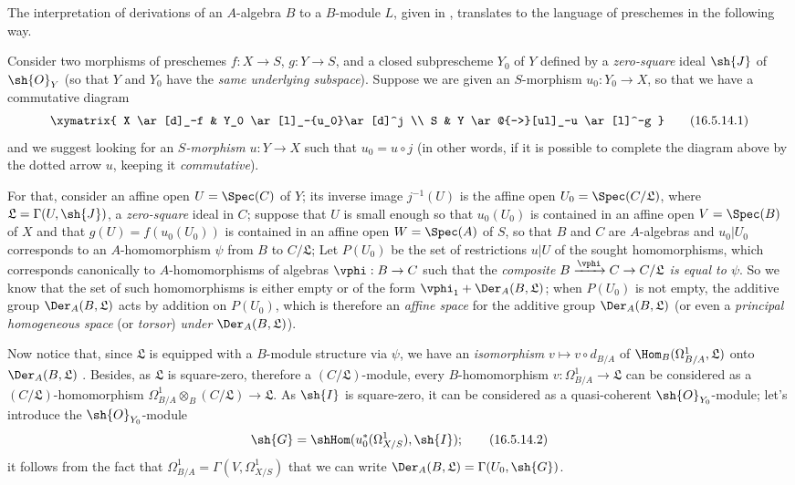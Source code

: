 \begin{env}[16.5.14]
\label{IV.16.5.14}
The interpretation of derivations of an $A$-algebra $B$ to a $B$-module $L$, given in , translates to the language of preschemes in the following way.

Consider two morphisms of preschemes $f : X \to S$, $g : Y \to S$, and a closed subprescheme $Y_0$ of $Y$ defined by a \emph{zero-square} ideal $\sh{J}$ of $\sh{O}_Y$ (so that $Y$ and $Y_0$ have the \emph{same underlying subspace}).
Suppose we are given an $S$-morphism $u_0 : Y_0 \to X$, so that we have a commutative diagram
\[
\label{IV.16.5.14.1}
  \xymatrix{
    X \ar[d]_-f & Y_0 \ar[l]_-{u_0}\ar[d]^j \\
    S & Y \ar@{-->}[ul]_-u \ar[l]^-g
  }
  \tag{16.5.14.1}
\]
and we suggest looking for an \emph{$S$-morphism} $u : Y \to X$ such that $u_0 = u \circ j$ (in other words, if it is possible to complete the diagram above by the dotted arrow $u$, keeping it \emph{commutative}).

For that, consider an affine open $U = \Spec(C)$ of $Y$;
its inverse image $j^{-1}(U)$ is the affine open $U_0 = \Spec(C/\mathfrak{L})$, where $\mathfrak{L} = \Gamma(U, \sh{J})$, a \emph{zero-square} ideal in $C$;
suppose that $U$ is small enough so that $u_0(U_0)$ is contained in an affine open $V = \Spec(B)$ of $X$ and that $g(U) = f(u_0(U_0))$ is contained in an affine open $W = \Spec(A)$ of $S$, so that $B$ and $C$ are $A$-algebras and $u_0|U_0$ corresponds to an $A$-homomorphism $\psi$ from $B$ to $C/\mathfrak{L}$;
Let $P(U_0)$ be the set of restrictions $u|U$ of the sought homomorphisms, which corresponds canonically to $A$-homomorphisms of algebras $\vphi : B \to C$ such that the \emph{composite $B \xrightarrow{\vphi} C \to C/\mathfrak{L}$ is equal to $\psi$}.
So we know  that the set of such homomorphisms is either empty or of the form $\vphi_1 + \Der_A(B, \mathfrak{L})$;
when $P(U_0)$ is not empty, the additive group $\Der_A(B, \mathfrak{L})$ acts by addition on $P(U_0)$, which is therefore an \emph{affine space} for the additive group $\Der_A(B, \mathfrak{L})$ (or even a \emph{principal homogeneous space} (or \emph{torsor}) \emph{under} $\Der_A(B, \mathfrak{L})$).

Now notice that, since $\mathfrak{L}$ is equipped with a $B$-module structure via $\psi$, we have an \emph{isomorphism} $v \mapsto v \circ d_{B/A}$ of $\Hom_B(\Omega_{B/A}^1, \mathfrak{L})$ onto $\Der_A(B, \mathfrak{L})$ .
Besides, as $\mathfrak{L}$ is square-zero, therefore a $(C/\mathfrak{L})$-module, every $B$-homomorphism $v : \Omega_{B/A}^1 \to \mathfrak{L}$ can be considered as a $(C/\mathfrak{L})$-homomorphism $\Omega_{B/A}^1 \otimes_B (C/\mathfrak{L}) \to \mathfrak{L}$.
As $\sh{I}$ is square-zero, it can be considered as a quasi-coherent $\sh{O}_{Y_0}$-module;
let's introduce the $\sh{O}_{Y_0}$-module
\[
\label{IV.16.5.14.2}
  \sh{G} = \shHom(u_0^*(\Omega_{X/S}^1), \sh{I});
  \tag{16.5.14.2}
\]
it follows from the fact that $\Omega_{B/A}^1 = \Gamma(V, \Omega_{X/S}^1)$  that we can write $\Der_A(B, \mathfrak{L}) = \Gamma(U_0, \sh{G})$.


\end{env}
